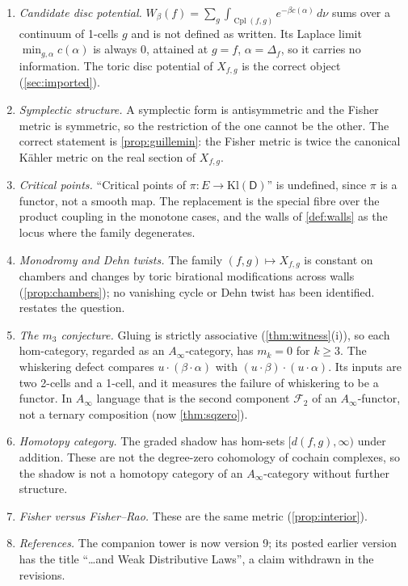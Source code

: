 \documentclass[11pt]{article}
\theoremstyle{definition}
\theoremstyle{remark}
\newcommand{\D}{\mathsf{D}}
\newcommand{\Kl}{\mathrm{Kl}}
\newcommand{\Cpl}{\operatorname{Cpl}}
\begin{document}
\begin{enumerate}[leftmargin=*]
\item \emph{Candidate disc potential.} $W_\beta(f)=\sum_g\int_{\Cpl(f,g)}e^{-\beta c(\alpha)}\,d\nu$ sums over a
  continuum of 1-cells $g$ and is not defined as written. Its Laplace limit
  $\min_{g,\alpha}c(\alpha)$ is always $0$, attained at $g=f$, $\alpha=\Delta_f$, so it carries no
  information. The toric disc potential of $X_{f,g}$ is the correct object (\cref{sec:imported}).
\item \emph{Symplectic structure.} A symplectic form is antisymmetric and the Fisher metric is
  symmetric, so the restriction of the one cannot be the other. The correct statement is
  \cref{prop:guillemin}: the Fisher metric is twice the canonical K\"ahler metric on the real section
  of $X_{f,g}$.
\item \emph{Critical points.} ``Critical points of $\pi\colon E\to\Kl(\D)$'' is undefined, since $\pi$ is a
  functor, not a smooth map. The replacement is the special fibre over the product coupling in the
  monotone cases, and the walls of \cref{def:walls} as the locus where the family degenerates.
\item \emph{Monodromy and Dehn twists.} The family $(f,g)\mapsto X_{f,g}$ is constant on chambers
  and changes by toric birational modifications across walls (\cref{prop:chambers}); no vanishing
  cycle or Dehn twist has been identified.  restates the question.
\item \emph{The $m_3$ conjecture.} Gluing is strictly associative (\cref{thm:witness}(i)), so each
  hom-category, regarded as an $A_\infty$-category, has $m_k=0$ for $k\ge3$. The whiskering defect
  compares $u\cdot(\beta\cdot\alpha)$ with $(u\cdot\beta)\cdot(u\cdot\alpha)$. Its inputs are two 2-cells and a
  1-cell, and it measures the failure of whiskering to be a functor. In $A_\infty$ language that is the
  second component $\mathcal{F}_2$ of an $A_\infty$-functor, not a ternary composition
  (now \cref{thm:sqzero}).
\item \emph{Homotopy category.} The graded shadow has hom-sets $[d(f,g),\infty)$ under addition. These
  are not the degree-zero cohomology of cochain complexes, so the shadow is not a homotopy category of
  an $A_\infty$-category without further structure.
\item \emph{Fisher versus Fisher--Rao.} These are the same metric (\cref{prop:interior}).
\item \emph{References.} The companion tower is now version 9; its posted earlier version has the
  title ``\ldots and Weak Distributive Laws'', a claim withdrawn in the revisions.
\end{enumerate}
\end{document}
